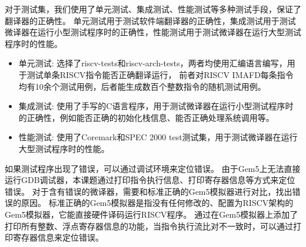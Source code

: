 对于测试集，我们使用了单元测试、集成测试、性能测试等多种测试手段，保证了翻译器的正确性。
单元测试用于测试软件端翻译器的正确性，集成测试用于测试微译器在运行小型测试程序时的正确性，性能测试用于测试微译器在运行大型测试程序时的性能。
\begin{itemize}
\item 单元测试: 选择了riscv-tests\cite{riscv-tests}和riscv-arch-tests\cite{riscv-arch-tests}，两者均使用汇编语言编写，用于测试单条RISCV指令能否正确翻译运行，
前者对RISCV IMAFD每条指令均有10余个测试用例，后者能生成数百个整数指令的随机测试用例。
\item 集成测试: 使用了手写的C语言程序，用于测试微译器在运行小型测试程序时的正确性，例如能否正确的初始化栈信息、能否正确处理系统调用等。
\item 性能测试: 使用了Coremark和SPEC 2000 test测试集，用于测试微译器在运行大型测试程序时的性能。
\end{itemize}

如果测试程序出现了错误，可以通过调试环境来定位错误。
由于Gem5上无法直接运行GDB调试器，本课题通过打印指令执行信息、打印寄存器信息等方式来定位错误。
对于含有错误的微译器，需要和标准正确的Gem5模拟器进行对比，找出错误的原因。
标准正确的Gem5模拟器是指没有任何修改的、配置为RISCV架构的Gem5模拟器，它能直接硬件译码运行RISCV程序。
通过在Gem5模拟器上添加了打印所有整数、浮点寄存器信息的功能，当指令执行流比对不一致时，可以通过打印寄存器信息来定位错误。





